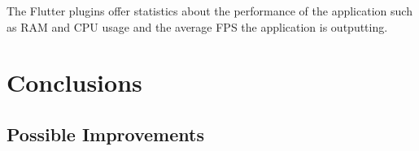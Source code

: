 \documentclass[a4paper,12pt]{report}
\begin{document}
The Flutter plugins offer statistics about the performance of the application
such as RAM and CPU usage and the average FPS the application is outputting.

\chapter{Conclusions}

\section{Possible Improvements}



\end{document}
